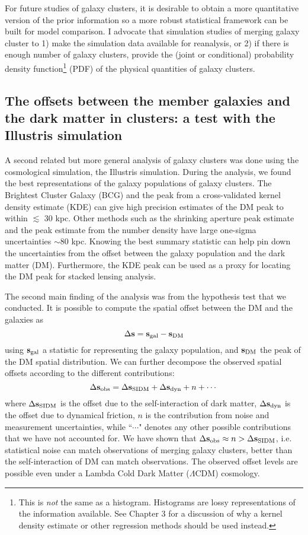 For future studies of galaxy clusters, 
it is desirable to obtain a more quantitative version of the 
prior information so a more robust statistical framework can be built for model
comparison. 
I advocate that simulation studies of merging galaxy cluster  
to 1) make the simulation data available for reanalysis, or 2) if there is
enough number of galaxy clusters, provide the
(joint or conditional) probability density function\footnote{This is {\it not}
the same as a histogram. Histograms are lossy representations of the information 
available. See Chapter 3 for a discussion of why a kernel density estimate or
other regression methods should be used instead.} (PDF) of the physical quantities
of galaxy clusters. 

\subsection{The offsets between the member galaxies and the dark
matter in clusters: a test with the Illustris simulation}
A second related but more general analysis of galaxy clusters was done using the
cosmological simulation, the Illustris simulation. 
During the analysis, we found the best 
representations of the galaxy populations of galaxy clusters. 
The Brightest Cluster
Galaxy (BCG) and the peak from a cross-validated kernel density estimate (KDE)
can give high precision estimates of the DM peak to within $\lesssim$ 30 kpc.
Other methods such as the shrinking aperture peak estimate and the peak estimate 
from the number density have large one-sigma uncertainties $\sim 80$ kpc.   
Knowing the best summary statistic can help pin down the uncertainties from  
the offset between the galaxy population and the dark matter (DM). Furthermore,
the KDE peak can be used as a proxy for locating the DM peak for stacked
lensing analysis.  

The second main finding of the analysis was from the hypothesis test that we
conducted.
It is possible to compute the spatial 
offset between the DM and the galaxies as 
\begin{equation}
	\Delta {\bf s} =  {\bf s}_{\rm gal} - {\bf s}_{\rm DM}
\end{equation}
using ${\bf s}_{\rm gal}$ a statistic for representing the galaxy population,
and ${\bf s}_{\rm DM}$ the peak of the DM spatial distribution.
We can further decompose the observed spatial offsets according to the different
contributions: 
\begin{equation}
	\Delta {\bf s}_{\rm obs} = \Delta {\bf s}_{\mathrm{SIDM}} + \Delta {\bf s}_{\rm dyn} + n + \cdots
\end{equation}
where $\Delta {\bf s}_{\mathrm{SIDM}}$ is the offset due to the self-interaction of dark matter, 
$\Delta {\bf s}_{\rm dyn}$ is the offset due to dynamical friction, $n$ is the
contribution from noise and measurement uncertainties, while ``$\cdots$" denotes
any other possible contributions that we have not accounted for. 
We have shown that $\Delta {\bf s}_{\rm obs} \approx  n  > \Delta {\bf s}_{\mathrm{SIDM}}$, i.e. 
statistical noise can match observations of merging galaxy clusters, better than 
the self-interaction of DM can match observations. 
The observed offset levels are possible even under  
a Lambda Cold Dark Matter ($\Lambda$CDM) cosmology. 

